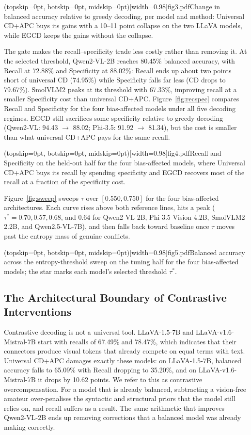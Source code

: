 \documentclass{ieeeaccess}
\begin{document}
\Figure[!ht](topskip=0pt, botskip=0pt, midskip=0pt)[width=0.98\columnwidth]{fig3.pdf}{Change in balanced accuracy relative to greedy decoding, per model and method: Universal CD+APC buys its gains with a 10--11 point collapse on the two LLaVA models, while EGCD keeps the gains without the collapse.\label{fig:delta}}

The gate makes the recall--specificity trade less costly rather than removing it. At the selected threshold, Qwen2-VL-2B reaches 80.45\% balanced accuracy, with Recall at 72.88\% and Specificity at 88.02\%: Recall ends up about two points short of universal CD (74.95\%) while Specificity falls far less (CD drops to 79.67\%). SmolVLM2 peaks at its threshold with 67.33\%, improving recall at a smaller Specificity cost than universal CD+APC. Figure~\ref{fig:recspec} compares Recall and Specificity for the four bias-affected models under all five decoding regimes. EGCD still sacrifices some specificity relative to greedy decoding (Qwen2-VL: 94.43 $\rightarrow$ 88.02; Phi-3.5: 91.92 $\rightarrow$ 81.34), but the cost is smaller than what universal CD+APC pays for the same recall.

\Figure[!ht](topskip=0pt, botskip=0pt, midskip=0pt)[width=0.98\columnwidth]{fig4.pdf}{Recall and Specificity on the held-out half for the four bias-affected models, where Universal CD+APC buys its recall by spending specificity and EGCD recovers most of the recall at a fraction of the specificity cost.\label{fig:recspec}}

Figure~\ref{fig:sweep} sweeps $\tau$ over $[0.550, 0.750]$ for the four bias-affected architectures. Each curve rises above both reference lines, hits a peak ($\tau^{*} = 0.70, 0.57, 0.68$, and $0.64$ for Qwen2-VL-2B, Phi-3.5-Vision-4.2B, SmolVLM2-2.2B, and Qwen2.5-VL-7B), and then falls back toward baseline once $\tau$ moves past the entropy mass of genuine conflicts.

\Figure[!ht](topskip=0pt, botskip=0pt, midskip=0pt)[width=0.98\columnwidth]{fig5.pdf}{Balanced accuracy across the entropy-threshold sweep on the tuning half for the four bias-affected models; the star marks each model's selected threshold $\tau^{*}$.\label{fig:sweep}}

\subsection{The Architectural Boundary of Contrastive Interventions}\label{subsec:boundary}

Contrastive decoding is not a universal tool. LLaVA-1.5-7B and LLaVA-v1.6-Mistral-7B start with recalls of 67.49\% and 78.47\%, which indicates that their connectors produce visual tokens that already compete on equal terms with text. Universal CD+APC damages exactly these models: on LLaVA-1.5-7B, balanced accuracy falls to 65.09\% with Recall dropping to 35.20\%, and on LLaVA-v1.6-Mistral-7B it drops by 10.62 points. We refer to this as contrastive overcompensation. For a model that is already balanced, subtracting a vision-free amateur over-penalises the syntactic and structural priors that the model still relies on, and recall suffers as a result. The same arithmetic that improves Qwen2-VL-2B ends up removing corrections that a balanced model was already making correctly.
\end{document}

